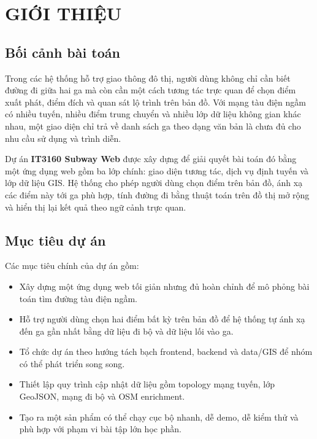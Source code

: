 \documentclass[../DoAn.tex]{subfiles}
\begin{document}
\chapter{GIỚI THIỆU}
\label{chapter:introduction}

\section{Bối cảnh bài toán}
Trong các hệ thống hỗ trợ giao thông đô thị, người dùng không chỉ cần biết đường đi giữa hai ga mà còn cần một cách tương tác trực quan để chọn điểm xuất phát, điểm đích và quan sát lộ trình trên bản đồ. Với mạng tàu điện ngầm có nhiều tuyến, nhiều điểm trung chuyển và nhiều lớp dữ liệu không gian khác nhau, một giao diện chỉ trả về danh sách ga theo dạng văn bản là chưa đủ cho nhu cầu sử dụng và trình diễn.

Dự án \textbf{IT3160 Subway Web} được xây dựng để giải quyết bài toán đó bằng một ứng dụng web gồm ba lớp chính: giao diện tương tác, dịch vụ định tuyến và lớp dữ liệu GIS. Hệ thống cho phép người dùng chọn điểm trên bản đồ, ánh xạ các điểm này tới ga phù hợp, tính đường đi bằng thuật toán trên đồ thị mở rộng và hiển thị lại kết quả theo ngữ cảnh trực quan.

\section{Mục tiêu dự án}
Các mục tiêu chính của dự án gồm:
\begin{itemize}
    \item Xây dựng một ứng dụng web tối giản nhưng đủ hoàn chỉnh để mô phỏng bài toán tìm đường tàu điện ngầm.
    \item Hỗ trợ người dùng chọn hai điểm bất kỳ trên bản đồ để hệ thống tự ánh xạ đến ga gần nhất bằng dữ liệu đi bộ và dữ liệu lối vào ga.
    \item Tổ chức dự án theo hướng tách bạch frontend, backend và data/GIS để nhóm có thể phát triển song song.
    \item Thiết lập quy trình cập nhật dữ liệu gồm topology mạng tuyến, lớp GeoJSON, mạng đi bộ và OSM enrichment.
    \item Tạo ra một sản phẩm có thể chạy cục bộ nhanh, dễ demo, dễ kiểm thử và phù hợp với phạm vi bài tập lớn học phần.
\end{itemize}
\end{document}
